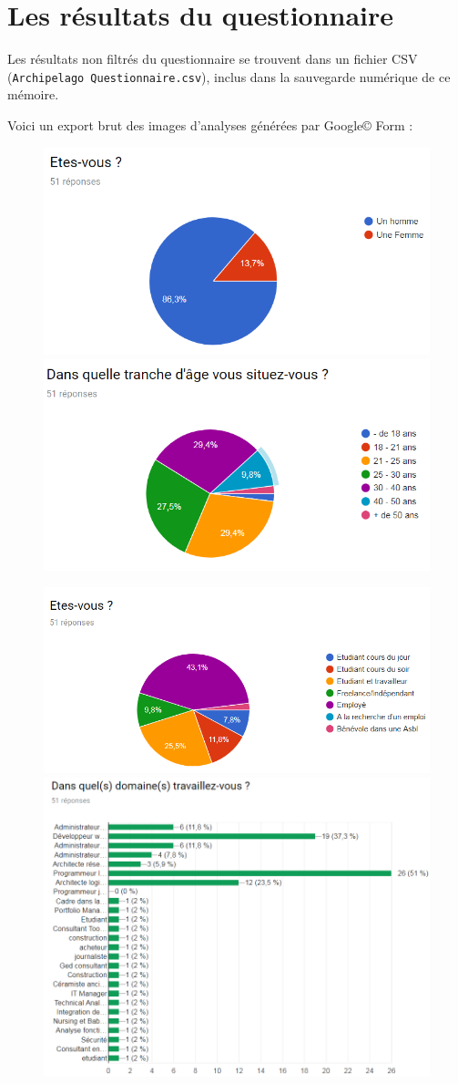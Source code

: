 \documentclass[a4paper,fleqn,12pt,oneside]{book}
\begin{document}
\section*{Les résultats du questionnaire}
Les résultats non filtrés du questionnaire se trouvent dans un fichier CSV (\texttt{Archipelago Questionnaire.csv}), inclus dans la sauvegarde numérique de ce mémoire.

Voici un export brut des images d'analyses générées par Google{\mbox{\scriptsize{\copyright}}} Form :

\begin{figure}[htp]
\centering
    \includegraphics[width=.45\textwidth]{figures/1.png}\quad
    \includegraphics[width=.45\textwidth]{figures/2.png}
\end{figure}
\begin{figure}[htp]
\centering
    \includegraphics[width=.45\textwidth]{figures/3.png}\quad
    \includegraphics[width=.45\textwidth]{figures/4.png}
\end{figure}
\end{document}
